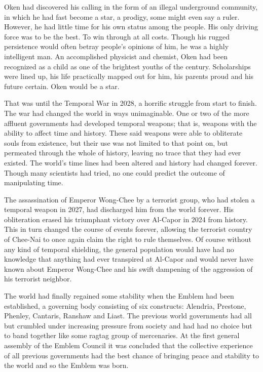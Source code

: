 Oken had discovered his calling in the form of an illegal underground community, in which he had fast become a star, a prodigy, some might even say a ruler. However, he had little time for his own status among the people. His only driving force was to be the best. To win through at all costs. Though his rugged persistence would often betray people's opinions of him, he was a highly intelligent man. An accomplished physicist and chemist, Oken had been recognized as a child as one of the brightest youths of the century. Scholarships were lined up, his life practically mapped out for him, his parents proud and his future certain. Oken would be a star.

That was until the Temporal War in 2028, a horrific struggle from start to finish. The war had changed the world in ways unimaginable. One or two of the more affluent governments had developed temporal weapons; that is, weapons with the ability to affect time and history. These said weapons were able to obliterate souls from existence, but their use was not limited to that point on, but permeated through the whole of history, leaving no trace that they had ever existed. The world's time lines had been altered and history had changed forever. Though many scientists had tried, no one could predict the outcome of manipulating time.

The assassination of Emperor Wong-Chee by a terrorist group, who had stolen a temporal weapon in 2027, had discharged him from the world forever. His obliteration erased his triumphant victory over Al-Capor in 2024 from history. This in turn changed the course of events forever, allowing the terrorist country of Chee-Nai to once again claim the right to rule themselves. Of course without any kind of temporal shielding, the general population would have had no knowledge that anything had ever transpired at Al-Capor and would never have known about Emperor Wong-Chee and his swift dampening of the aggression of his terrorist neighbor.

The world had finally regained some stability when the Emblem had been established, a governing body consisting of six constructs: Alendria, Prestone, Phenley, Cantaris, Ranshaw and Liast. The previous world governments had all but crumbled under increasing pressure from society and had had no choice but to band together like some ragtag group of mercenaries. At the first general assembly of the Emblem Council it was concluded that the collective experience of all previous governments had the best chance of bringing peace and stability to the world and so the Emblem was born.

